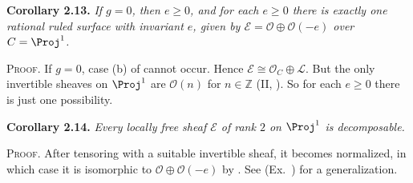 {\medskip
\noindent\hypertarget{result-V-2.13}{}\textbf{Corollary 2.13.} \textit{If $g=0$, then $e\geq0$, and for each $e\geq0$ there is exactly one rational ruled surface with invariant $e$, given by $\mathcal E=\mathcal O\oplus\mathcal O(-e)$ over $C=\Proj^1$.}

\smallskip
\noindent\textsc{Proof.} If $g=0$, case (b) of  cannot occur. Hence $\mathcal E\cong\mathcal O_C\oplus\mathcal L$. But the only invertible sheaves on $\Proj^1$ are $\mathcal O(n)$ for $n\in\mathbb Z$ (II, ). So for each $e\geq0$ there is just one possibility.

\medskip
\noindent\hypertarget{result-V-2.14}{}\textbf{Corollary 2.14.} \textit{Every locally free sheaf $\mathcal E$ of rank $2$ on $\Proj^1$ is decomposable.}

\smallskip
\noindent\textsc{Proof.} After tensoring with a suitable invertible sheaf, it becomes normalized, in which case it is isomorphic to $\mathcal O\oplus\mathcal O(-e)$ by . See (Ex.~) for a generalization.
}

